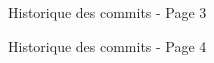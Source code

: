 \documentclass [a4 paper,11pt]{report}
\begin{document}
\begin{center}
  \begin{figure}[h!]
  \noindent{}
  \caption{Historique des commits - Page 3}
  \end{figure}

  \begin{figure}[h!]
  \noindent{}
  \caption{Historique des commits - Page 4}
  \end{figure}


\end{center}
\end{document}
